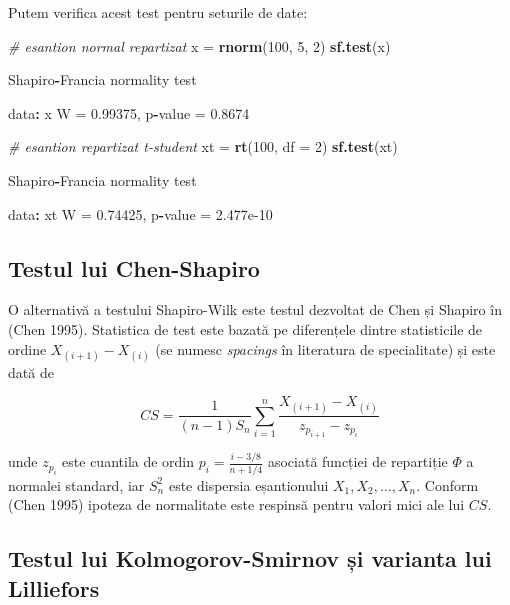 \documentclass[]{article}
\newenvironment{Shaded}{\begin{snugshade}}{\end{snugshade}}
\newcommand{\KeywordTok}[1]{\textcolor[rgb]{0.13,0.29,0.53}{\textbf{#1}}}
\newcommand{\DataTypeTok}[1]{\textcolor[rgb]{0.13,0.29,0.53}{#1}}
\newcommand{\DecValTok}[1]{\textcolor[rgb]{0.00,0.00,0.81}{#1}}
\newcommand{\FloatTok}[1]{\textcolor[rgb]{0.00,0.00,0.81}{#1}}
\newcommand{\StringTok}[1]{\textcolor[rgb]{0.31,0.60,0.02}{#1}}
\newcommand{\CommentTok}[1]{\textcolor[rgb]{0.56,0.35,0.01}{\textit{#1}}}
\newcommand{\OperatorTok}[1]{\textcolor[rgb]{0.81,0.36,0.00}{\textbf{#1}}}
\newcommand{\NormalTok}[1]{#1}
\begin{document}
Putem verifica acest test pentru seturile de date:

\begin{Shaded}
\begin{Highlighting}[]
\CommentTok{# esantion normal repartizat }
\NormalTok{x =}\StringTok{ }\KeywordTok{rnorm}\NormalTok{(}\DecValTok{100}\NormalTok{, }\DecValTok{5}\NormalTok{, }\DecValTok{2}\NormalTok{)}
\KeywordTok{sf.test}\NormalTok{(x)}

\NormalTok{    Shapiro}\OperatorTok{-}\NormalTok{Francia normality test}

\NormalTok{data}\OperatorTok{:}\StringTok{  }\NormalTok{x}
\NormalTok{W =}\StringTok{ }\FloatTok{0.99375}\NormalTok{, p}\OperatorTok{-}\NormalTok{value =}\StringTok{ }\FloatTok{0.8674}

\CommentTok{# esantion repartizat t-student}
\NormalTok{xt =}\StringTok{ }\KeywordTok{rt}\NormalTok{(}\DecValTok{100}\NormalTok{, }\DataTypeTok{df =} \DecValTok{2}\NormalTok{)}
\KeywordTok{sf.test}\NormalTok{(xt)}

\NormalTok{    Shapiro}\OperatorTok{-}\NormalTok{Francia normality test}

\NormalTok{data}\OperatorTok{:}\StringTok{  }\NormalTok{xt}
\NormalTok{W =}\StringTok{ }\FloatTok{0.74425}\NormalTok{, p}\OperatorTok{-}\NormalTok{value =}\StringTok{ }\FloatTok{2.477e-10}
\end{Highlighting}
\end{Shaded}

\subsection{Testul lui Chen-Shapiro}\label{testul-lui-chen-shapiro}

O alternativă a testului Shapiro-Wilk este testul dezvoltat de Chen și
Shapiro în (Chen 1995). Statistica de test este bazată pe diferențele
dintre statisticile de ordine \(X_{(i+1)} - X_{(i)}\) (se numesc
\emph{spacings} în literatura de specialitate) și este dată de

\[
  CS = \frac{1}{(n-1)S_n}\sum_{i = 1}^{n}\frac{X_{(i+1)} - X_{(i)}}{z_{p_{i+1}} - z_{p_i}}
\]

unde \(z_{p_i}\) este cuantila de ordin
\(p_i = \frac{i - 3/8}{n + 1/4}\) asociată funcției de repartiție
\(\Phi\) a normalei standard, iar \(S_n^2\) este dispersia eșantionului
\(X_1, X_2, \ldots, X_n\). Conform (Chen 1995) ipoteza de normalitate
este respinsă pentru valori mici ale lui \(CS\).

\subsection{Testul lui Kolmogorov-Smirnov și varianta lui
Lilliefors}\label{testul-lui-kolmogorov-smirnov-si-varianta-lui-lilliefors}
\end{document}
